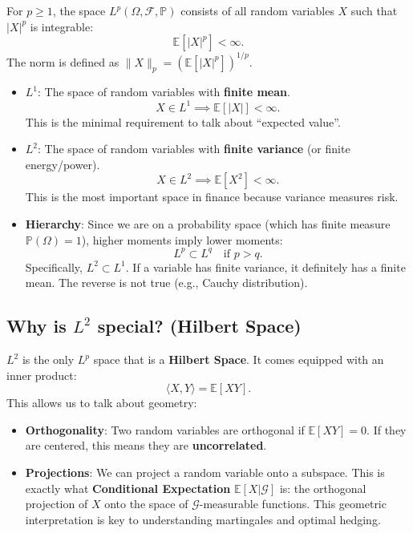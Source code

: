\begin{definition}[$L^p$ Spaces]
For $p \geq 1$, the space $L^p(\Omega, \mathcal{F}, \mathbb{P})$ consists of all random variables $X$ such that $|X|^p$ is integrable:
\[
\mathbb{E}[|X|^p] < \infty.
\]
The norm is defined as $\|X\|_p = (\mathbb{E}[|X|^p])^{1/p}$.
\end{definition}

\begin{itemize}
    \item \textbf{$L^1$}: The space of random variables with \textbf{finite mean}.
    \[
    X \in L^1 \implies \mathbb{E}[|X|] < \infty.
    \]
    This is the minimal requirement to talk about ``expected value''.
    
    \item \textbf{$L^2$}: The space of random variables with \textbf{finite variance} (or finite energy/power).
    \[
    X \in L^2 \implies \mathbb{E}[X^2] < \infty.
    \]
    This is the most important space in finance because variance measures risk.
    \item \textbf{Hierarchy}: Since we are on a probability space (which has finite measure $\mathbb{P}(\Omega)=1$), higher moments imply lower moments:
    \[
    L^p \subset L^q \quad \text{if } p > q.
    \]
    Specifically, $L^2 \subset L^1$. If a variable has finite variance, it definitely has a finite mean. The reverse is not true (e.g., Cauchy distribution).
\end{itemize}

\subsection{Why is \texorpdfstring{$L^2$}{L2} special? (Hilbert Space)}
$L^2$ is the only $L^p$ space that is a \textbf{Hilbert Space}. It comes equipped with an inner product:
\[
\langle X, Y \rangle = \mathbb{E}[XY].
\]
This allows us to talk about geometry:
\begin{itemize}
    \item \textbf{Orthogonality}: Two random variables are orthogonal if $\mathbb{E}[XY] = 0$. If they are centered, this means they are \textbf{uncorrelated}.

    \item \textbf{Projections}: We can project a random variable onto a subspace. This is exactly what \textbf{Conditional Expectation} $\mathbb{E}[X|\mathcal{G}]$ is: the orthogonal projection of $X$ onto the space of $\mathcal{G}$-measurable functions. This geometric interpretation is key to understanding martingales and optimal hedging.
\end{itemize}

